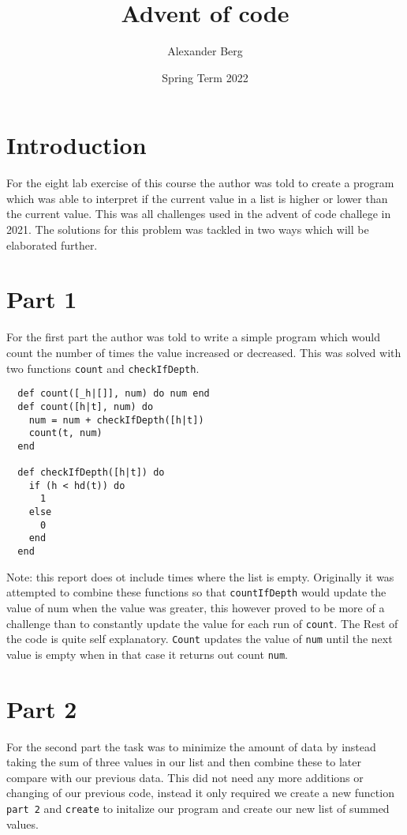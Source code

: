 \documentclass[a4paper,11pt]{article}
\begin{document}
\title{
    \textbf{Advent of code}
}
\author{Alexander Berg}
\date{Spring Term 2022}

\maketitle

\section*{Introduction}

For the eight lab exercise of this course the author was told to create a program which was able to interpret if the current value in a list is higher or lower than the current value. This was all challenges used in the advent of code challege in 2021. The solutions for this problem was tackled in two ways which will be elaborated further.

\section*{Part 1}

For the first part the author was told to write a simple program which would count the number of times the value increased or decreased. This was solved with two functions {\tt count} and {\tt checkIfDepth}.

\begin{verbatim}
  def count([_h|[]], num) do num end
  def count([h|t], num) do
    num = num + checkIfDepth([h|t])
    count(t, num)
  end

  def checkIfDepth([h|t]) do
    if (h < hd(t)) do
      1
    else
      0
    end
  end
\end{verbatim}

Note: this report does ot include times where the list is empty.
Originally it was attempted to combine these functions so that {\tt countIfDepth} would update the value of num when the value was greater, this however proved to be more of a challenge than to constantly update the value for each run of {\tt count}. The Rest of the code is quite self explanatory. {\tt Count} updates the value of {\tt num} until the next value is empty when in that case it returns out count {\tt num}.

\section*{Part 2}

For the second part the task was to minimize the amount of data by instead taking the sum of three values in our list and then combine these to later compare with our previous data. This did not need any more additions or changing of our previous code, instead it only required we create a new function {\tt part 2} and {\tt create} to initalize our program and create our new list of summed values.
\end{document}
